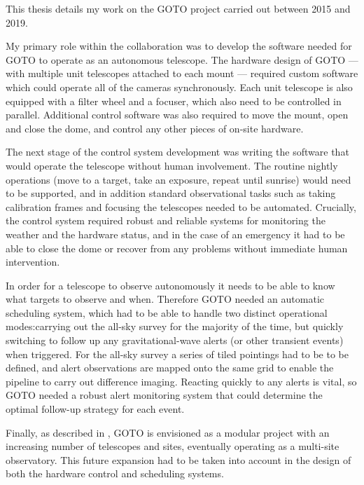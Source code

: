 \begin{colsection}

This thesis details my work on the GOTO project carried out between 2015 and 2019.

My primary role within the collaboration was to develop the software needed for GOTO to operate as an autonomous telescope. The hardware design of GOTO --- with multiple unit telescopes attached to each mount --- required custom software which could operate all of the cameras synchronously. Each unit telescope is also equipped with a filter wheel and a focuser, which also need to be controlled in parallel. Additional control software was also required to move the mount, open and close the dome, and control any other pieces of on-site hardware.

The next stage of the control system development was writing the software that would operate the telescope without human involvement. The routine nightly operations (move to a target, take an exposure, repeat until sunrise) would need to be supported, and in addition standard observational tasks such as taking calibration frames and focusing the telescopes needed to be automated. Crucially, the control system required robust and reliable systems for monitoring the weather and the hardware status, and in the case of an emergency it had to be able to close the dome or recover from any problems without immediate human intervention.

In order for a telescope to observe autonomously it needs to be able to know what targets to observe and when. Therefore GOTO needed an automatic scheduling system, which had to be able to handle two distinct operational modes:\@ carrying out the all-sky survey for the majority of the time, but quickly switching to follow up any gravitational-wave alerts (or other transient events) when triggered. For the all-sky survey a series of tiled pointings had to be to be defined, and alert observations are mapped onto the same grid to enable the pipeline to carry out difference imaging. Reacting quickly to any alerts is vital, so GOTO needed a robust alert monitoring system that could determine the optimal follow-up strategy for each event.

Finally, as described in , GOTO is envisioned as a modular project with an increasing number of telescopes and sites, eventually operating as a multi-site observatory. This future expansion had to be taken into account in the design of both the hardware control and scheduling systems.


\end{colsection}
